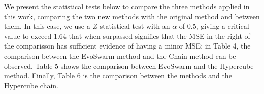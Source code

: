 \documentclass[runningheads]{llncs}
\begin{document}
We present the statistical tests below to compare the three methods
applied in this work, comparing the two new methods with the original
method and between them. In this case, we use a \(Z\) statistical test
with an $\alpha$ of 0.5, giving a critical value to exceed 1.64 that 
when surpassed signifies that the MSE in the right of the comparisson 
has sufficient evidence of having a minor MSE; %
in Table 4, the comparison between the EvoSwarm method and the Chain
method can be observed. Table 5 shows the comparison between EvoSwarm
and the Hypercube method. Finally, Table 6 is the comparison between
the methods and the Hypercube chain.\hfill \break
\end{document}
